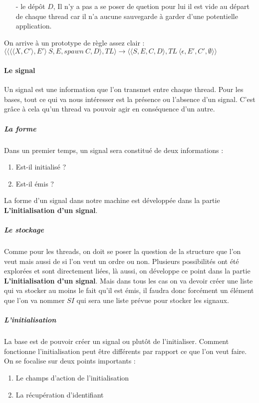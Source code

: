 \documentclass[10pt,a4paper]{report}
\begin{document}
\begin{enumerate}
\begin{enumerate}
		\end{enumerate}
		
		\item[-] le dépôt $D$, Il n'y a pas a se poser de quetion pour lui il est vide au départ de chaque thread car il n'a aucune sauvegarde à garder d'une potentielle application.
	\end{enumerate}
	\bigbreak
	
	On arrive à un prototype de règle assez clair : 
	$\langle \langle \langle\langle X,C'\rangle,E'\rangle~S,E,spawn~C,D\rangle,TL\rangle
	\longrightarrow 
	\langle \langle S,E,C,D\rangle,TL~\langle\epsilon,E',C',\emptyset\rangle\rangle$
	\medbreak
	
	\paragraph{Le signal} 
	Un signal est une information que l'on transmet entre chaque thread. Pour les bases, tout ce qui va nous intéresser est la présence ou l'absence d'un signal. C'est grâce à cela qu'un thread va pouvoir agir en conséquence d'un autre. 
	
	\subparagraph{La forme} 
	Dans un premier temps, un signal sera constitué de deux informations : 
	\begin{enumerate}
		\item Est-il initialisé ?
		\item Est-il émis ?
	\end{enumerate}
	La forme d'un signal dans notre machine est développée dans la partie \textbf{L'initialisation d'un signal}.
	
	\subparagraph{Le stockage}
	Comme pour les threads, on doit se poser la question de la structure que l'on veut mais aussi de si l'on veut un ordre ou non. Plusieurs possibilités ont été explorées et sont directement liées, là aussi, on développe ce point dans la partie \textbf{L'initialisation d'un signal}. Mais dans tous les cas on va devoir créer une liste qui va stocker au moins le fait qu'il est émis, il faudra donc forcément un élément que l'on va nommer $SI$ qui sera une liste prévue pour stocker les signaux.
	\bigbreak 
	
	
	\subparagraph{L'initialisation}
	La base est de pouvoir créer un signal ou plutôt de l'initialiser. Comment fonctionne l'initialisation peut être différents par rapport ce que l'on veut faire. On se focalise sur deux points importants : 
	\begin{enumerate}
		\item Le champs d'action de l'initialisation
		\item La récupération d'identifiant 
	\end{enumerate}
	\medbreak
	
\end{document}
